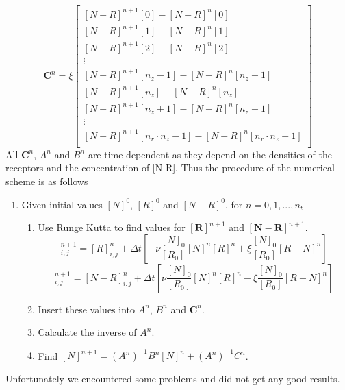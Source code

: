 \documentclass{article}
\begin{document}
\begin{equation}
\boldsymbol{C}^n = \xi
    \begin{bmatrix}
        [N-R]^{n+1}[0]-[N-R]^{n}[0] \\
        [N-R]^{n+1}[1]-[N-R]^{n}[1] \\
        [N-R]^{n+1}[2]-[N-R]^{n}[2] \\
        \vdots \\
        [N-R]^{n+1}[n_z-1]-[N-R]^{n}[n_z-1] \\
        [N-R]^{n+1}[n_z]-[N-R]^{n}[n_z] \\
        [N-R]^{n+1}[n_z+1]-[N-R]^{n}[n_z+1] \\
        \vdots \\
        [N-R]^{n+1}[n_r \cdot n_z-1]-[N-R]^{n}[n_r \cdot n_z-1] \\
    \end{bmatrix}
\end{equation}
All $\boldsymbol{C}^n$, $A^n$ and $B^n$ are time dependent as they depend on the densities of the receptors and the concentration of [N-R]. Thus the procedure of the numerical scheme is as follows 
\begin{enumerate}
    \item Given initial values $[N]^0$, $[R]^0$ and $[N-R]^0$, for $n = 0, 1, ..., n_t$
    \begin{enumerate}
        \item Use Runge Kutta to find values for  $\boldsymbol{[R]}^{n+1}$ and $\boldsymbol{[N-R]}^{n+1}$. \begin{equation}
            [R]^{n+1}_{i,j} = [R]^{n}_{i,j} + \Delta t \left[- \nu \frac{[N]_0}{[R_0]} [N]^{n} [R]^{n} + \xi \frac{[N]_0}{[R_0]} [R-N]^{n} \right]
        \end{equation} 
        \begin{equation}
            [N-R]^{n+1}_{i,j} = [N-R]^{n}_{i,j} + \Delta t \left[ \nu \frac{[N]_0}{[R_0]} [N]^{n} [R]^{n} - \xi \frac{[N]_0}{[R_0]} [R-N]^{n} \right]
        \end{equation} 
        \item Insert these values into $A^n$, $B^n$ and $\boldsymbol{C}^n$.
        \item Calculate the inverse of $A^n$. 
        \item Find $[N]^{n+1} = (A^n)^{-1} B^n [N]^{n} + (A^n)^{-1}C^n$.  
    \end{enumerate}
\end{enumerate}
Unfortunately we encountered some problems and did not get any good results.
\end{document}
